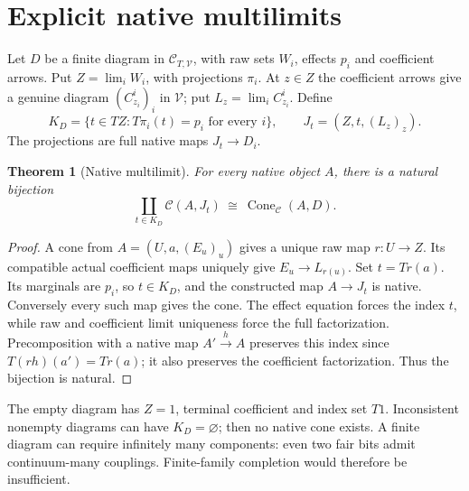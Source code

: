 \documentclass[11pt]{article}
\newtheorem{theorem}{Theorem}\newtheorem{proposition}[theorem]{Proposition}
\begin{document}
\section{Explicit native multilimits}
Let $D$ be a finite diagram in $\mathcal C_{T,\mathcal V}$, with raw sets $W_i$, effects $p_i$ and coefficient arrows. Put $Z=\lim_i W_i$, with projections $\pi_i$. At $z\in Z$ the coefficient arrows give a genuine diagram $(C^i_{z_i})_i$ in $\mathcal V$; put $L_z=\lim_i C^i_{z_i}$. Define
\[
 K_D=\{t\in TZ:T\pi_i(t)=p_i\text{ for every }i\},\qquad
 J_t=(Z,t,(L_z)_z).
\]
The projections are full native maps $J_t\to D_i$.
\begin{theorem}[Native multilimit]
For every native object $A$, there is a natural bijection
\[
 \coprod_{t\in K_D}\mathcal C(A,J_t)
 \ \cong\ \operatorname{Cone}_{\mathcal C}(A,D).
\]
\end{theorem}
\begin{proof}
A cone from $A=(U,a,(E_u)_u)$ gives a unique raw map $r:U\to Z$. Its compatible actual coefficient maps uniquely give $E_u\to L_{r(u)}$. Set $t=Tr(a)$. Its marginals are $p_i$, so $t\in K_D$, and the constructed map $A\to J_t$ is native. Conversely every such map gives the cone. The effect equation forces the index $t$, while raw and coefficient limit uniqueness force the full factorization. Precomposition with a native map $A'\xrightarrow{h}A$ preserves this index since $T(rh)(a')=Tr(a)$; it also preserves the coefficient factorization. Thus the bijection is natural.
\end{proof}
The empty diagram has $Z=1$, terminal coefficient and index set $T1$. Inconsistent nonempty diagrams can have $K_D=\varnothing$; then no native cone exists. A finite diagram can require infinitely many components: even two fair bits admit continuum-many couplings. Finite-family completion would therefore be insufficient.
\end{document}
